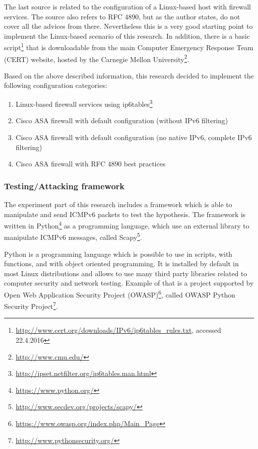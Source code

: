\documentclass[12pt]{article}
\begin{document}
The last source is related to the configuration of a Linux-based host with firewall services. The source also refers to RFC 4890, but as the author states, do not cover all the advices from there. Nevertheless this is a very good starting point to implement the Linux-based scenario of this research\cite{ip6tablesGiobbi}. In addition, there is a basic script\footnote{\url{http://www.cert.org/downloads/IPv6/ip6tables_rules.txt}, accessed 22.4.2016} that is downloadable from the main Computer Emergency Response Team (CERT) website, hosted by the Carnegie Mellon University\footnote{\url{http://www.cmu.edu/}}. 

Based on the above described information, this research decided to implement the following configuration categories:
\vspace{-10pt}
\begin{enumerate}[noitemsep,topsep=0pt,partopsep=0pt]
 \item Linux-based firewall services using ip6tables\footnote{\url{http://ipset.netfilter.org/ip6tables.man.html}}
 \item Cisco ASA firewall with default configuration (without IPv6 filtering)
 \item Cisco ASA firewall with default configuration (no native IPv6, complete IPv6 filtering)
 \item Cisco ASA firewall with RFC 4890 best practices
\end{enumerate}


\subsubsection{Testing/Attacking framework}
\label{subsub:framework}

The experiment part of this research includes a framework which is able to manipulate and send ICMPv6 packets to test the hypothesis. The framework is written in Python\footnote{\url{https://www.python.org/}} as a programming language, which use an external library to manipulate ICMPv6 messages, called Scapy\footnote{\url{http://www.secdev.org/projects/scapy/}}.

Python is a programming language which is possible to use in scripts, with functions, and with object oriented programming. It is installed by default in most Linux distributions and allows to use many third party libraries related to computer security and network testing. Example of that is a project supported by Open Web Application Security Project (OWASP)\footnote{\url{https://www.owasp.org/index.php/Main_Page}}, called OWASP Python Security Project\footnote{\url{http://www.pythonsecurity.org/}}.
\end{document}

